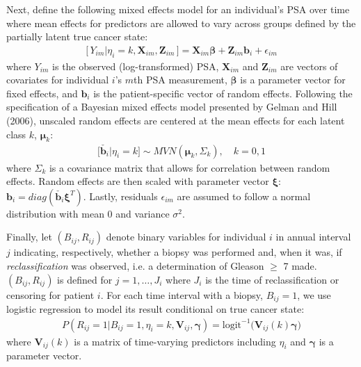 \documentclass[12pt, letterpaper]{article}
\newcommand{\bmbeta}{\boldsymbol{\beta}}
\newcommand{\bmxi}{\boldsymbol{\xi}}
\newcommand{\bmmu}{\boldsymbol{\mu}}
\newcommand{\bmgamma}{\boldsymbol{\gamma}}
\newcommand{\bmZ}{\mathbf{Z}}
\newcommand{\bmX}{\mathbf{X}}
\newcommand{\bmV}{\mathbf{V}}
\newcommand{\bmb}{\mathbf{b}}
\newcommand{\bea}{\begin{eqnarray}}
\newcommand{\eea}{\end{eqnarray}}
\newcommand{\beas}{\begin{eqnarray*}}
\newcommand{\eeas}{\end{eqnarray*}}
\begin{document}
Next, define the following mixed effects model \cite{Laird1982} for an individual's PSA over time where mean effects for predictors are allowed to vary across groups defined by the partially latent true cancer state:
\beas
\big[\, Y_{im} | \eta_i=k, \bmX_{im}, \bmZ_{im}\,\big] = \bmX_{im}\bmbeta + \bmZ_{im}\bmb_i + \epsilon_{im}
\eeas
where $Y_{im}$ is the observed (log-transformed) PSA, $\bmX_{im}$ and $\bmZ_{im}$ are vectors of covariates for individual $i$'s $m$th PSA measurement, $\bmbeta$ is a parameter vector for fixed effects, and $\bmb_i$ is the patient-specific vector of random effects. Following the specification of a Bayesian mixed effects model presented by Gelman and Hill (2006)\nocite{Gelman2006}, unscaled random effects are centered at the mean effects for each latent class $k$, $\bmmu_k$:
\beas
\big[\check{\bmb_i} | \eta_i=k\big] \sim MVN ( \bmmu_k, \Sigma_k), \quad k=0,1 
\eeas
where $\Sigma_k$ is a covariance matrix that allows for correlation between random effects. Random effects are then scaled with parameter vector $\bmxi$: $\bmb_i = diag(\check{\bmb_i}\bmxi^T)$. Lastly, residuals $\epsilon_{im}$ are assumed to follow a normal distribution with mean 0 and variance $\sigma^2$.

Finally, let $(B_{ij}, R_{ij})$ denote binary variables for individual $i$ in annual interval $j$ indicating, respectively, whether a biopsy was performed and, when it was, if \textit{reclassification} was observed, i.e. a determination of Gleason $\geq$ 7 made. $(B_{ij}, R_{ij})$ is defined for $j=1,\dots, J_i$ where $J_i$ is the time of reclassification or censoring for patient $i$. For each time interval with a biopsy, $B_{ij}=1$, we use logistic regression to model its result conditional on true cancer state:
\bea
\label{eq:p_rc}
P(R_{ij}=1 | B_{ij}=1, \eta_i=k, \bmV_{ij}, \bmgamma) = \text{logit}^{-1}\big( \bmV_{ij}(k)\bmgamma \big)
\eea
where $\bmV_{ij}(k)$ is a matrix of time-varying predictors including $\eta_i$ and $\bmgamma$ is a parameter vector. 
\end{document}

